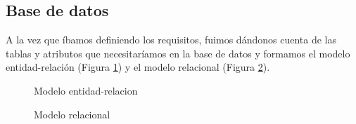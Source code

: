\subsection{Base de datos}

A la vez que íbamos definiendo los requisitos, fuimos dándonos cuenta de las tablas y atributos que necesitaríamos en la base de datos y formamos el modelo entidad-relación (Figura \ref{fig:ent_rel}) y el modelo relacional (Figura \ref{fig:rel}).

\begin{figure}
\begin{center}
\caption{Modelo entidad-relacion\label{fig:ent_rel}}
\end{center}
\end{figure}

\begin{figure}
\begin{center}
\caption{Modelo relacional\label{fig:rel}}
\end{center}
\end{figure}

